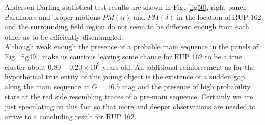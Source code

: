 \documentclass[draft]{aa}
\begin{document}
Anderson-Darling statistical test results are shown in Fig. \ref{fig50}, right
panel. Parallaxes and proper motions $PM(\alpha)$ and $PM(\delta)$ in the
location of RUP 162 and the surrounding field region do not seem to be
different enough from each other as to be efficiently disentangled.\\

Although weak enough the presence of a probable main sequence in the 
panels of Fig. \ref{fig49}, make us cautious leaving some chance for RUP 162 to
be a true cluster about $0.80\pm0.20\times10^9$ years old.
An additional reinforcement as for the hypothetical true entity of this young
object is the existence of a sudden gap along the main sequence at $G=16.5$ mag
and the presence of high probability stars at the red side resembling traces of
a pre-main sequence. Certainly we are just speculating on this fact so that
more and deeper observations are needed to arrive to a concluding result for
RUP 162.
\end{document}
